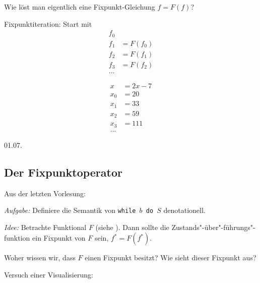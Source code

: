 \begin{remark}[Intuition]
    Wie löst man eigentlich eine Fixpunkt-Gleichung $f = F(f)$?

    Fixpunktiteration: Start mit \begin{align*}
        f_0 & \\
        f_1 & = F(f_0) \\
        f_2 & = F(f_1) \\
        f_3 & = F(f_2) \\
        \dots
    \end{align*}
\end{remark}

\begin{example}
    \begin{align*}
        x & = 2x - 7 \\
        x_0 & = 20 \\
        x_1 & = 33 \\
        x_2 & = 59 \\
        x_3 & = 111 \\
        \dots
    \end{align*}
\end{example}


\newpage
\hfill 01.07.

\subsection{Der Fixpunktoperator}

\begin{remark}[Recap]
    Aus der letzten Vorlesung:

    \emph{Aufgabe:} Definiere die Semantik von \texttt{while $b$ do $S$} denotationell.

    \emph{Idee:} Betrachte Funktional $F$ (siehe ). Dann sollte die Zustands"-über"-führungs"-funktion ein Fixpunkt von $F$ sein, \dh{} $f^* = F(f^*)$.
\end{remark}

\par\bigskip
\begin{question}
    Woher wissen wir, dass $F$ einen Fixpunkt besitzt? Wie sieht dieser Fixpunkt aus?
\end{question}

\par\bigskip
Versuch einer Visualisierung:

